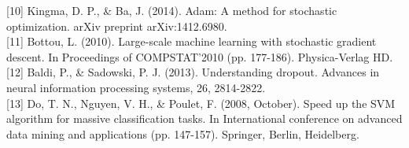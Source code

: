 \documentclass[runningheads]{llncs}
\begin{document}
[10] Kingma, D. P., \& Ba, J. (2014). Adam: A method for stochastic optimization. arXiv preprint arXiv:1412.6980.\\

[11] Bottou, L. (2010). Large-scale machine learning with stochastic gradient descent. In Proceedings of COMPSTAT'2010 (pp. 177-186). Physica-Verlag HD.\\

[12] Baldi, P., \& Sadowski, P. J. (2013). Understanding dropout. Advances in neural information processing systems, 26, 2814-2822.\\

[13] Do, T. N., Nguyen, V. H., \& Poulet, F. (2008, October). Speed up the SVM algorithm for massive classification tasks. In International conference on advanced data mining and applications (pp. 147-157). Springer, Berlin, Heidelberg.
\end{document}
